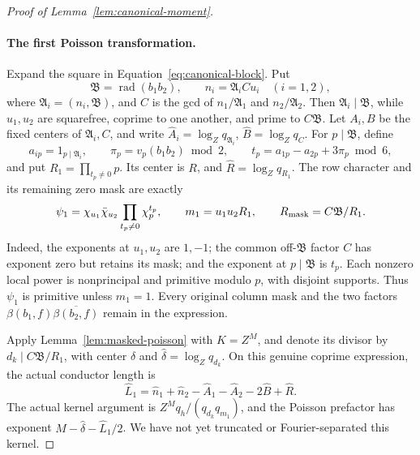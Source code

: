 \documentclass[12pt]{article}
\begin{document}
\begin{proof}[Proof of Lemma~\ref{lem:canonical-moment}]
\paragraph{The first Poisson transformation.}
Expand the square in Equation~\eqref{eq:canonical-block}.  Put
\[
 \mathfrak B=\operatorname{rad}(b_1b_2),\qquad
 n_i=\mathfrak A_i C u_i\quad(i=1,2),
\]
where \(\mathfrak A_i=(n_i,\mathfrak B)\), and \(C\) is the gcd of
\(n_1/\mathfrak A_1\) and \(n_2/\mathfrak A_2\).  Then
\(\mathfrak A_i\mid\mathfrak B\), while \(u_1,u_2\) are squarefree,
coprime to one another, and prime to \(C\mathfrak B\).  Let \(A_i,B\)
be the fixed centers of \(\mathfrak A_i,C\), and write
\(\widehat A_i=\log_Zq_{\mathfrak A_i}\), \(\widehat B=\log_Zq_C\).
For \(p\mid\mathfrak B\), define
\[
 a_{ip}=1_{p\mid\mathfrak A_i},\qquad
 \pi_p=v_p(b_1b_2)\bmod2,\qquad
 t_p=a_{1p}-a_{2p}+3\pi_p\bmod6,
\]
and put \(R_1=\prod_{t_p\ne0}p\).  Its center is \(R\), and
\(\widehat R=\log_Zq_{R_1}\).
The row character and its remaining zero mask are exactly
\begin{equation}\label{eq:first-masked-data}
 \psi_1=\chi_{u_1}\bar\chi_{u_2}
               \prod_{t_p\ne0}\chi_p^{t_p},\qquad
 m_1=u_1u_2R_1,\qquad
 R_{\rm mask}=C\mathfrak B/R_1.
\end{equation}
Indeed, the exponents at \(u_1,u_2\) are \(1,-1\); the common
off-\(\mathfrak B\) factor \(C\) has exponent zero but retains its
mask; and the exponent at \(p\mid\mathfrak B\) is \(t_p\).  Each
nonzero local power is nonprincipal and primitive modulo \(p\), with
disjoint supports.  Thus \(\psi_1\) is primitive unless \(m_1=1\).
Every original column mask and the two factors
\(\beta(b_1,f)\overline{\beta(b_2,f)}\) remain in the expression.

Apply Lemma~\ref{lem:masked-poisson} with \(K=Z^M\), and denote its
divisor by \(d_k\mid C\mathfrak B/R_1\), with center \(\delta\) and
\(\widehat\delta=\log_Zq_{d_k}\).  On this genuine coprime expression,
the actual conductor length is
\begin{equation}\label{eq:first-poisson-lengths}
 \widehat L_1=\widehat n_1+\widehat n_2-\widehat A_1-\widehat A_2
                    -2\widehat B+\widehat R.
\end{equation}
The actual kernel argument is \(Z^Mq_h/(q_{d_k}q_{m_1})\), and the
Poisson prefactor has exponent \(M-\widehat\delta-\widehat L_1/2\).
We have not yet truncated or Fourier-separated this kernel.


\end{proof}
\end{document}

